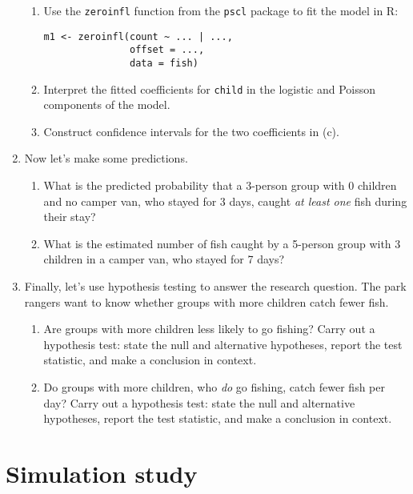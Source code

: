 \documentclass[11pt]{article}
\begin{document}
\begin{enumerate}
\begin{enumerate}
\item Use the \texttt{zeroinfl} function from the \texttt{pscl} package to fit the model in R:

\begin{verbatim}
m1 <- zeroinfl(count ~ ... | ...,
               offset = ...,
               data = fish)
\end{verbatim}

\item Interpret the fitted coefficients for \texttt{child} in the logistic and Poisson components of the model.

\item Construct confidence intervals for the two coefficients in (c).
\end{enumerate}

\item Now let's make some predictions.

\begin{enumerate}
\item What is the predicted probability that a 3-person group with 0 children and no camper van, who stayed for 3 days, caught \textit{at least one} fish during their stay?

\item What is the estimated number of fish caught by a 5-person group with 3 children in a camper van, who stayed for 7 days?
\end{enumerate}

\item Finally, let's use hypothesis testing to answer the research question. The park rangers want to know whether groups with more children catch fewer fish.

\begin{enumerate}
\item Are groups with more children less likely to go fishing? Carry out a hypothesis test: state the null and alternative hypotheses, report the test statistic, and make a conclusion in context.

\item Do groups with more children, who \textit{do} go fishing, catch fewer fish per day? Carry out a hypothesis test: state the null and alternative hypotheses, report the test statistic, and make a conclusion in context.
\end{enumerate}

\end{enumerate}

\newpage

\section*{Simulation study}
\end{document}
